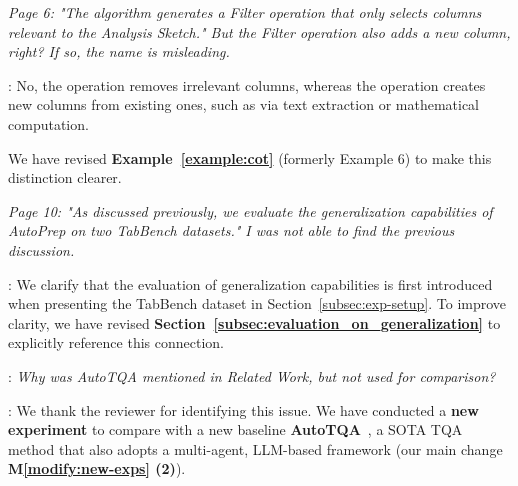 \begin{shaded}
{
\noindent
{} 
\emph{Page 6: "The algorithm generates a Filter operation that only selects columns relevant to the Analysis Sketch." But the Filter operation also adds a new column, right? If so, the name is misleading.
}}
\end{shaded}

: 
No, the  operation removes irrelevant columns, whereas the  operation creates new columns from existing ones, such as via text extraction or mathematical computation. 

We have revised \textbf{Example~\ref{example:cot}} (formerly Example 6) to make this distinction clearer.


\begin{shaded}
{

\emph{Page 10: "As discussed previously, we evaluate the generalization capabilities of AutoPrep on two TabBench datasets." I was not able to find the previous discussion.
}
}
\end{shaded}

: 
We clarify that the evaluation of generalization capabilities is first introduced when presenting the TabBench dataset in Section~\ref{subsec:exp-setup}. 
%
To improve clarity, we have revised \textbf{Section~\ref{subsec:evaluation_on_generalization}} to explicitly reference this connection.


\begin{shaded}
{

: 
\emph{Why was AutoTQA mentioned in Related Work, but not used for comparison?
}
}
\end{shaded}

: 
We thank the reviewer for identifying this issue. 
We have conducted a \textbf{new experiment} to compare \sys with a new baseline \textbf{AutoTQA}~\cite{DBLP:journals/pvldb/ZhuCXLSZSTL24}, a SOTA TQA method that also adopts a multi-agent, LLM-based framework (our main change \textbf{M\ref{modify:new-exps} (2)}).

